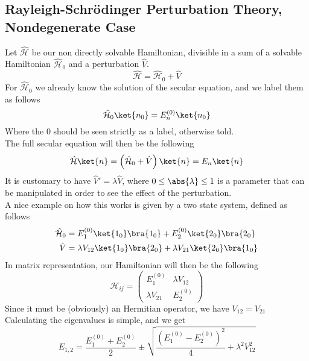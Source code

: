 \documentclass[a4paper, 11pt]{book}
\newcommand{\1}{\opr{\mathds{1}}}
\newcommand{\ham}{\mathcal{H}}
\newcommand{\opr}[1]{\hat{#1}}
\newcommand{\oham}{\opr{\mathcal{H}}}
\theoremstyle{plain}
\begin{document}
	\subsection{Rayleigh-Schrödinger Perturbation Theory, Nondegenerate Case}
	Let $\opr{\ham}$ be our non directly solvable Hamiltonian, divisible in a sum of a solvable Hamiltonian $\opr{\ham}_0$ and a perturbation $\opr{V}$.
	\begin{equation}
		\opr{\ham}=\oham_0+\opr{V}
		\label{eq:pertham1}
	\end{equation}
	For $\oham_0$ we already know the solution of the secular equation, and we label them as follows
	\begin{equation}
		\oham_0\ket{n_0}=E_n^{(0)}\ket{n_0}
		\label{eq:phsec0}
	\end{equation}
	Where the $0$ should be seen strictly as a label, otherwise told.\\
	The full secular equation will then be the following
	\begin{equation}
		\oham\ket{n}=\left( \oham_0+\opr{V} \right)\ket{n}=E_n\ket{n}
		\label{eq:phsec}
	\end{equation}
	It is customary to have $\opr{V}'=\lambda\opr{V}$, where $0\le\abs{\lambda}\le1$ is a parameter that can be manipulated in order to see the effect of the perturbation.\\
	A nice example on how this works is given by a two state system, defined as follows
	\begin{equation}
		\begin{aligned}
			\oham_0&=E_1^{(0)}\ket{1_0}\bra{1_0}+E_2^{(0)}\ket{2_0}\bra{2_0}\\
			\opr{V}&=\lambda V_{12}\ket{1_0}\bra{2_0}+\lambda V_{21}\ket{2_0}\bra{1_0}
		\end{aligned}
		\label{eq:toytheoryham}
	\end{equation}
	In matrix representation, our Hamiltonian will then be the following
	\begin{equation}
		\ham_{ij}=\begin{pmatrix}
			E^{(0)}_1&\lambda V_{12}\\
			\lambda V_{21}&E^{(0)}_2
		\end{pmatrix}
		\label{eq:twolevel}
	\end{equation}
	Since it must be (obviously) an Hermitian operator, we have $V_{12}=V_{21}$
	Calculating the eigenvalues is simple, and we get
	\begin{equation}
		E_{1,2}=\frac{E_1^{(0)}+E_2^{(0)}}{2}\pm\sqrt{\frac{(E_1^{(0)}-E_2^{(0)})^2}{4}+\lambda^2V_{12}^2}
		\label{eq:eigenperthamtoy}
	\end{equation}
\end{document}

